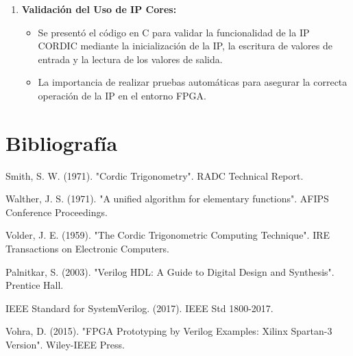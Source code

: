 \documentclass[12pt,a4paper, twoside]{article} %
\begin{document}
\begin{enumerate}
    \item \textbf{Validación del Uso de IP Cores:}
    \begin{itemize}
        \item Se presentó el código en C para validar la funcionalidad de la IP CORDIC mediante la inicialización de la IP, la escritura de valores de entrada y la lectura de los valores de salida.
        \item La importancia de realizar pruebas automáticas para asegurar la correcta operación de la IP en el entorno FPGA.
    \end{itemize}
\end{enumerate}


\newpage
\section{Bibliografía}

\begin{thebibliography}{6}
Smith, S. W. (1971). "Cordic Trigonometry". RADC Technical Report.

Walther, J. S. (1971). "A unified algorithm for elementary functions". AFIPS Conference Proceedings.

Volder, J. E. (1959). "The Cordic Trigonometric Computing Technique". IRE Transactions on Electronic Computers.

Palnitkar, S. (2003). "Verilog HDL: A Guide to Digital Design and Synthesis". Prentice Hall.

IEEE Standard for SystemVerilog. (2017). IEEE Std 1800-2017.

Vohra, D. (2015). "FPGA Prototyping by Verilog Examples: Xilinx Spartan-3 Version". Wiley-IEEE Press.

\end{thebibliography}
\end{document}
